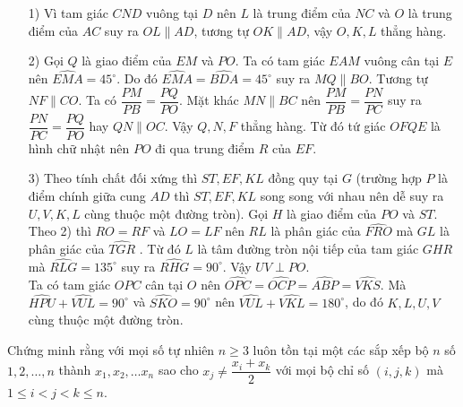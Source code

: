 \begin{ex}
{\begin{enumerate}
\item[1)] Vì tam giác $CND$ vuông tại $D$ nên $L$ là trung điểm của $NC$ và $O$ là trung điểm của $AC$ suy ra $OL \parallel AD$, tương tự $OK \parallel AD$, vậy $O,K,L$ thẳng hàng. 
\item[2)] Gọi $Q$ là giao điểm của $EM$ và $PO$. Ta có tam giác $EAM$ vuông cân tại $E$ nên $\widehat{EMA} = 45^\circ$. Do đó $\widehat{EMA} =\widehat{BDA} =45^\circ$ suy ra $MQ \parallel BO$. Tương tự $NF \parallel CO$. Ta có $\dfrac{PM}{PB} = \dfrac{PQ}{PO}$. Mặt khác $MN \parallel BC$ nên $\dfrac{PM}{PB} = \dfrac{PN}{PC}$ suy ra $\dfrac{PN}{PC} = \dfrac{PQ}{PO}$ hay $QN \parallel OC$. Vậy $Q,N,F$ thẳng hàng. Từ đó tứ giác $OFQE$ là   hình chữ nhật nên $PO$ đi qua trung điểm $R$ của $EF$. 
\item[3)] Theo tính chất đối xứng thì $ST,EF,KL$ đồng quy tại $G$ (trường hợp $P$ là điểm chính giữa cung $AD$ thì $ST,EF,KL$ song song với nhau nên dễ suy ra $U,V,K,L$ cùng thuộc một đường tròn). Gọi $H$ là giao điểm của $PO$ và $ST$. Theo 2) thì $RO=RF$ và $LO=LF$ nên $RL$ là phân giác của $\widehat{FRO}$ mà $GL$ là phân giác của $\widehat{TGR}$ . Từ đó $L$ là tâm đường tròn nội tiếp của tam giác $GHR$ mà $\widehat{RLG} =135^\circ$ suy ra $\widehat{RHG} =90^\circ$. Vậy $UV \perp PO$. \\
Ta có tam giác $OPC$ cân tại $O$ nên $\widehat{OPC} = \widehat{OCP} =\widehat{ABP} =\widehat{VKS}$. 
Mà $\widehat{HPU} + \widehat{VUL} =90^\circ$ và $\widehat{SKO} =90^\circ$ nên 
$\widehat{VUL} + \widehat{VKL} =180^\circ$, do đó $K,L,U,V$ cùng thuộc một đường tròn. 
\end{enumerate}
}
\end{ex}

\begin{ex}%
Chứng minh rằng với mọi số tự nhiên $n \geq 3$ luôn tồn tại một các sắp xếp bộ $n$ số $1,2, \dots , n$ thành $x_1,x_2, \dots x_n$ sao cho $x_j \neq \dfrac{x_i+x_k}{2}$ với mọi bộ chỉ số $(i,j,k)$ mà $1 \leq i <j<k \leq n$. 
\end{ex}
